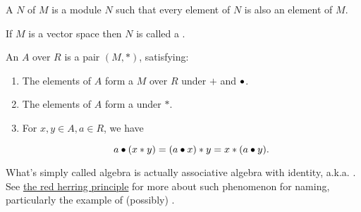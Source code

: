 \begin{remark}
    \label{mk:Submodule}

    A  $N$ of $M$ is a module $N$ such that every element of $N$ is also an element of $M$.

    If $M$ is a vector space then $N$ is called a .

\end{remark}





    

\begin{definition}[Algebra]
    \label{Algebra}
    \leanok

    An  $A$ over $R$ is a pair $(M, *)$, satisfying:

    \begin{enumerate}
    \item The elements of $A$ form a  $M$ over $R$ under $+$ and $\bullet$.

    \item The elements of $A$ form a  under $*$.

    \item For $x, y \in A, a \in R$, we have
    
    $$
    a \bullet (x * y) = (a \bullet x) * y = x * (a \bullet y).
    $$

    \end{enumerate}

\end{definition}

\begin{remark}
    \label{mk:Algebra}

    What's simply called algebra is actually associative algebra with identity, a.k.a. . See
    \href{https://ncatlab.org/nlab/show/red%20herring%20principle}{the red herring principle}
    for more about such phenomenon for naming, particularly the example of (possibly) .
    
\end{remark}

